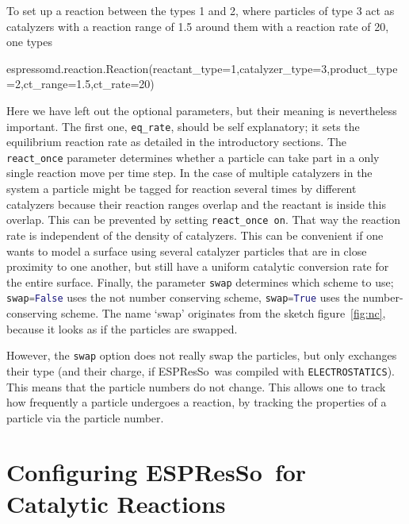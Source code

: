 \documentclass[aip,jcp,reprint,a4paper,onecolumn,nofootinbib,amsmath,amssymb]{revtex4-1}
\newcommand\code{\lstinline}
\newcommand{\es}{\mbox{\textsf{ESPResSo}}\xspace}
\newcommand\codees{\lstinline[language=python]}
\begin{document}
To set up a reaction between the types 1 and 2, where particles of type 3 act as catalyzers with a reaction range of 1.5 around them with a reaction rate of 20, one types
\begin{espresso}
espressomd.reaction.Reaction(reactant_type=1,catalyzer_type=3,product_type=2,ct_range=1.5,ct_rate=20)
\end{espresso}
Here we have left out the optional parameters, but their meaning is nevertheless important. The first one, \codees{eq_rate}, should be self explanatory; it sets the equilibrium reaction rate as detailed in the introductory sections. The \codees{react_once} parameter determines whether a particle can take part in a only single reaction move per time step. In the case of multiple catalyzers in the system a particle might be tagged for reaction several times by different catalyzers because their reaction ranges overlap and the reactant is inside this overlap. This can be  prevented by setting \code{react_once on}. That way the reaction rate is independent of the density of catalyzers. This can be convenient if one wants to model a surface using several catalyzer particles that are in close proximity to one another, but still have a uniform catalytic conversion rate for the entire surface. Finally, the parameter \codees{swap} determines which scheme to use; \codees{swap=False} uses the not number conserving scheme, \codees{swap=True} uses the number-conserving scheme. The name `swap' originates from the sketch figure~\ref{fig:nc}, because it looks as if the particles are swapped.

However, the \codees{swap} option does not really swap the particles, but only exchanges their type (and their charge, if \es\ was compiled with \code{ELECTROSTATICS}). This means that the particle numbers do not change. This allows one to track how frequently a particle undergoes a reaction, by tracking the properties of a particle via the particle number.

\section{Configuring \es\ for Catalytic Reactions}
\end{document}
